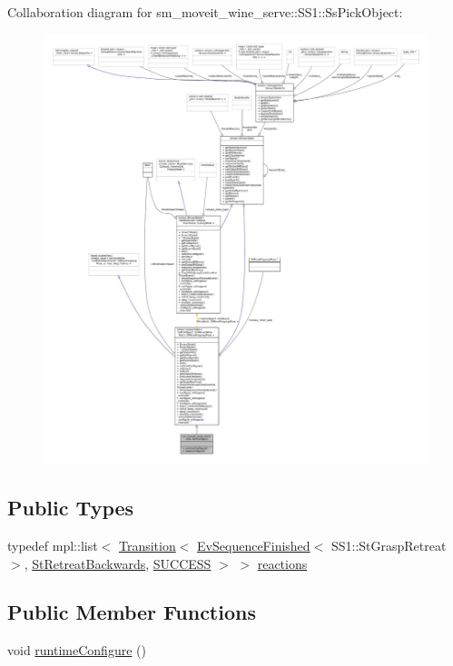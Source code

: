 Collaboration diagram for sm\+\_\+moveit\+\_\+wine\+\_\+serve\+:\+:S\+S1\+:\+:Ss\+Pick\+Object\+:
\nopagebreak
\begin{figure}[H]
\begin{center}
\leavevmode
\includegraphics[width=350pt]{structsm__moveit__wine__serve_1_1SS1_1_1SsPickObject__coll__graph}
\end{center}
\end{figure}
\subsection*{Public Types}
\begin{DoxyCompactItemize}
\item 
typedef mpl\+::list$<$ \hyperlink{classsmacc_1_1Transition}{Transition}$<$ \hyperlink{structsmacc_1_1default__events_1_1EvSequenceFinished}{Ev\+Sequence\+Finished}$<$ S\+S1\+::\+St\+Grasp\+Retreat $>$, \hyperlink{structsm__moveit__wine__serve_1_1StRetreatBackwards}{St\+Retreat\+Backwards}, \hyperlink{structsmacc_1_1default__transition__tags_1_1SUCCESS}{S\+U\+C\+C\+E\+SS} $>$ $>$ \hyperlink{structsm__moveit__wine__serve_1_1SS1_1_1SsPickObject_a72a26bf2abcbb1b0bac00e561ba1175c}{reactions}
\end{DoxyCompactItemize}
\subsection*{Public Member Functions}
\begin{DoxyCompactItemize}
\item 
void \hyperlink{structsm__moveit__wine__serve_1_1SS1_1_1SsPickObject_ac8588bd2d7202089aca31566ac553adc}{runtime\+Configure} ()
\end{DoxyCompactItemize}
